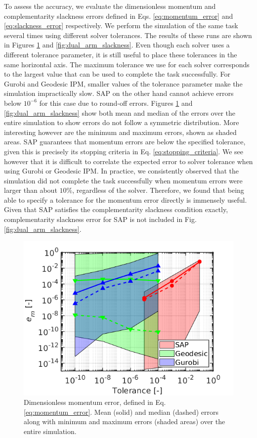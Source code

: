 To assess the accuracy, we evaluate the dimensionless momentum and
complementarity slackness errors defined in Eqs. \eqref{eq:momentum_error} and
\eqref{eq:slackness_error} respectively. We perform the simulation of the same
task several times using different solver tolerances. The results of these runs
are shown in Figures \ref{fig:dual_arm_momentum} and
\ref{fig:dual_arm_slackness}. Even though each solver uses a different tolerance
parameter, it is still useful to place these tolerances in the same horizontal
axis. The maximum tolerance we use for each solver corresponds to the largest value
that can be used to complete the task successfully. For Gurobi and Geodesic IPM,
smaller values of the tolerance parameter make the simulation impractically
slow. SAP on the other hand cannot achieve errors below $10^{-6}$ for this case
due to round-off errors. Figures \ref{fig:dual_arm_momentum} and
\ref{fig:dual_arm_slackness} show both mean and median of the errors over the
entire simulation to show errors do not follow a symmetric distribution. More
interesting however are the minimum and maximum errors, shown as shaded areas.
SAP guarantees that momentum errors are below the specified tolerance, given
this is precisely its stopping criteria in Eq. \eqref{eq:stopping_criteria}. We
see however that it is difficult to correlate the expected error to solver
tolerance when using Gurobi or Geodesic IPM. In practice, we consistently
observed that the simulation did not complete the task successfully when
momentum errors were larger than about $10\%$, regardless of the solver.
Therefore, we found that being able to specify a tolerance for the momentum
error directly is immensely useful. Given that SAP satisfies the complementarity
slackness condition exactly, complementarity slackness error for SAP is not
included in Fig. \ref{fig:dual_arm_slackness}.

\begin{figure}[!h]
	\centering
    \includegraphics[width=0.7\columnwidth]{figures/dual_arm/momentum_error.png}
    \caption{\label{fig:dual_arm_momentum} Dimensionless momentum error, defined
    in Eq. \eqref{eq:momentum_error}. Mean (solid) and median (dashed) errors
    along with minimum and maximum errors (shaded areas) over the entire simulation.}
\end{figure}

